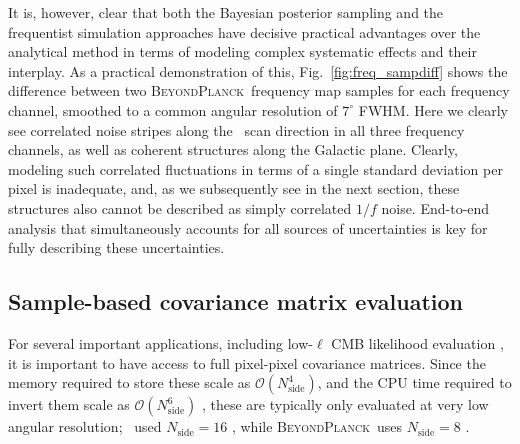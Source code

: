 \documentclass[twocolumn]{aa}
\newcommand{\BP}{\textsc{BeyondPlanck}}
\begin{document}
It is, however, clear that both the Bayesian posterior sampling and
the frequentist simulation approaches have decisive practical
advantages over the analytical method in terms of modeling complex
systematic effects and their interplay. As a practical demonstration
of this, Fig.~\ref{fig:freq_sampdiff} shows the difference between two
\BP\ frequency map samples for each frequency channel, smoothed to a
common angular resolution of $7^{\circ}$ FWHM. Here we clearly see
correlated noise stripes along the \Planck\ scan direction in all
three frequency channels, as well as coherent structures along the
Galactic plane. Clearly, modeling such correlated fluctuations in
terms of a single standard deviation per pixel is inadequate,
and, as we subsequently see in the next section, these structures also cannot
be described as simply correlated $1/f$ noise. End-to-end analysis
that simultaneously accounts for all sources of uncertainties is 
key for fully describing these uncertainties.

\subsection{Sample-based covariance matrix evaluation}

For several important applications, including low-$\ell$ CMB
likelihood evaluation \citep[e.g.,][]{page2007,planck2016-l05,bp12},
it is important to have access to full pixel-pixel covariance
matrices. Since the memory required to store these scale as
$\mathcal{O}(N_{\mathrm{side}}^4)$, and the CPU time required to
invert them scale as $\mathcal{O}(N_{\mathrm{side}}^6)$ \citep{sherman1949adjustment}, these are
typically only evaluated at very low angular resolution; \Planck\ used
$N_{\mathrm{side}}=16$ \citep{planck2016-l05}, while \BP\ uses
$N_{\mathrm{side}}=8$ \citep{bp12}.
\end{document}
